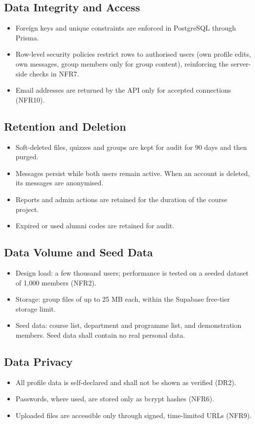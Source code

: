 \documentclass[10pt,a4paper]{article}
\begin{document}
\subsection{Data Integrity and Access}
\begin{itemize}
\item Foreign keys and unique constraints are enforced in PostgreSQL through Prisma.
\item Row-level security policies restrict rows to authorised users (own profile edits, own messages, group members only for group content), reinforcing the server-side checks in NFR7.
\item Email addresses are returned by the API only for accepted connections (NFR10).
\end{itemize}
\subsection{Retention and Deletion}
\begin{itemize}
\item Soft-deleted files, quizzes and groups are kept for audit for 90 days and then purged.
\item Messages persist while both users remain active. When an account is deleted, its messages are anonymised.
\item Reports and admin actions are retained for the duration of the course project.
\item Expired or used alumni codes are retained for audit.
\end{itemize}
\subsection{Data Volume and Seed Data}
\begin{itemize}
\item Design load: a few thousand users; performance is tested on a seeded dataset of 1,000 members (NFR2).
\item Storage: group files of up to 25 MB each, within the Supabase free-tier storage limit.
\item Seed data: course list, department and programme list, and demonstration members. Seed data shall contain no real personal data.
\end{itemize}
\subsection{Data Privacy}
\begin{itemize}
\item All profile data is self-declared and shall not be shown as verified (DR2).
\item Passwords, where used, are stored only as bcrypt hashes (NFR6).
\item Uploaded files are accessible only through signed, time-limited URLs (NFR9).
\end{itemize}
\end{document}
